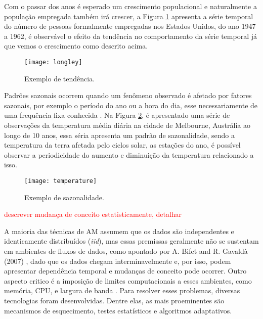 Com o passar dos anos é esperado um crescimento populacional e naturalmente a
população empregada também irá crescer, a Figura \ref{fig:trend} apresenta a
série temporal do número de pessoas formalmente empregadas nos Estados Unidos,
do ano 1947 a 1962, é observável o efeito da tendência no comportamento da
série temporal já que vemos o crescimento como descrito acima.

\begin{figure}[ht]
    \centering
    \texttt{[image: longley]}
    \caption{Exemplo de tendência.}
    \label{fig:trend}
\end{figure}

Padrões sazonais ocorrem quando um fenômeno observado é afetado por fatores
sazonais, por exemplo o período do ano ou a hora do dia, esse necessariamente
de uma frequência fixa conhecida
\cite{hyndman2018forecasting,brockwell2016introduction}. Na Figura
\ref{fig:seasonality}, é apresentado uma série de observações da temperatura
média diária na cidade de Melbourne, Austrália ao longo de 10 anos, essa séria
apresenta um padrão de sazonalidade, sendo a temperatura da terra afetada pelo
ciclos solar, as estações do ano, é possível observar a periodicidade do
aumento e diminuição da temperatura relacionado a isso.

\begin{figure}[ht]
    \centering
    \texttt{[image: temperature]}
    \caption{Exemplo de sazonalidade.}
    \label{fig:seasonality}
\end{figure}



\textcolor{red}{descrever mudança de conceito estatisticamente, detalhar}




A maioria das técnicas de AM assumem que os dados são independentes e
identicamente distribuídos (\textit{iid}), mas essas premissas geralmente não
se sustentam em ambientes de fluxos de dados, como apontado por A. Bifet and R.
Gavald\`a (2007) \cite{bifet2007learning}, dado que os dados chegam
interminavelmente e, por isso, podem apresentar dependência temporal e mudanças
de conceito pode ocorrer.  Outro aspecto critico é a imposição de limites
computacionais a esses ambientes, como memória, CPU, e largura de banda
\cite{bifet2010moa, gama2012survey}.  Para resolver esses problemas, diversas
tecnologias foram desenvolvidas. Dentre elas, as mais proeminentes são
mecanismos de esquecimento, testes estatísticos e algoritmos adaptativos.

